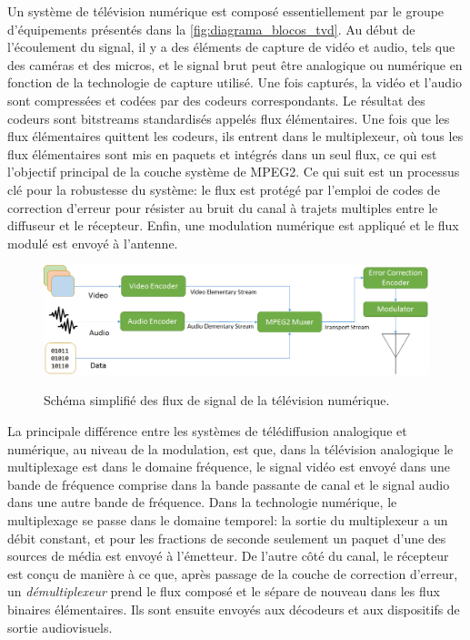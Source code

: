 \documentclass[12pt,a4paper]{article}
\begin{document}
Un système de télévision numérique est composé essentiellement par le groupe d'équipements présentés dans la \autoref{fig:diagrama_blocos_tvd}. Au début de l'écoulement du signal, il y a des éléments de capture de vidéo et audio, tels que des caméras et des micros, et le signal brut peut être analogique ou numérique en fonction de la technologie de capture utilisé. Une fois capturés, la vidéo et l'audio sont compressées et codées par des codeurs correspondants. Le résultat des codeurs sont bitstreams standardisés appelés flux élémentaires. Une fois que les flux élémentaires quittent les codeurs, ils entrent dans le multiplexeur, où tous les flux élémentaires sont mis en paquets et intégrés dans un seul flux, ce qui est l'objectif principal de la couche système de MPEG2. Ce qui suit est un processus clé pour la robustesse du système: le flux est protégé par l'emploi de codes de correction d'erreur pour résister au bruit du canal à trajets multiples entre le diffuseur et le récepteur. Enfin, une modulation numérique est appliqué et le flux modulé est envoyé à l'antenne.

 \begin{figure}[!h]
\centering
\caption{Schéma simplifié des flux de signal de la télévision numérique.}
\includegraphics[width=1\linewidth]{pictures/diagrama_blocos_tvd.png}
\label{fig:diagrama_blocos_tvd}
\end{figure}
 
La principale différence entre les systèmes de télédiffusion analogique et numérique, au niveau de la modulation, est que, dans la télévision analogique le multiplexage est dans le domaine fréquence, le signal vidéo est envoyé dans une bande de fréquence comprise dans la bande passante de canal et le signal audio dans une autre bande de fréquence. Dans la technologie numérique, le multiplexage se passe dans le domaine temporel: la sortie du multiplexeur a un débit constant, et pour les fractions de seconde seulement un paquet d'une des sources de média est envoyé à l'émetteur. De l'autre côté du canal, le récepteur est conçu de manière à ce que, après passage de la couche de correction d'erreur, un \textit{démultiplexeur} prend le flux composé et le sépare de nouveau dans les flux binaires élémentaires. Ils sont ensuite envoyés aux décodeurs et aux dispositifs de sortie audiovisuels.
\end{document}
